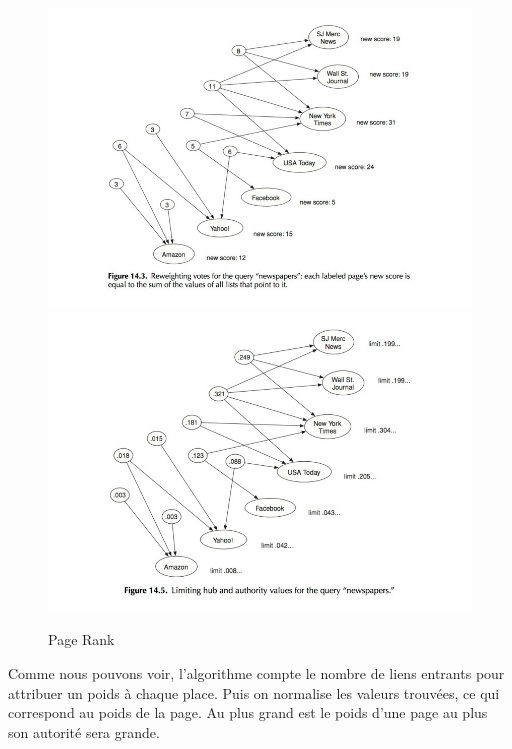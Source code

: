 \begin{figure}
\centering
\includegraphics[scale=0.5]{images/ref/fig-14-3.jpeg}
\includegraphics[scale=0.5]{images/ref/fig-14-5.jpeg}
\caption{Page Rank}
\label{pageRankNews2}
\end{figure}



\newpage

	
Comme nous pouvons voir, l'algorithme compte le nombre de liens entrants pour attribuer un poids à chaque place. Puis on normalise les valeurs trouvées, ce qui correspond au poids de la page.
Au plus grand est le poids d'une page au plus son autorité sera grande.\\
